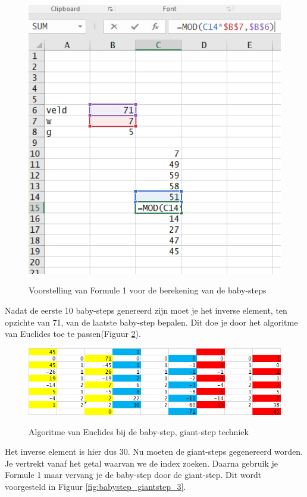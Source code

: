 \documentclass{article}
\begin{document}
\begin{figure}
  \begin{center}
  \caption{Voorstelling van Formule 1 voor de berekening van de baby-steps}
  \includegraphics[width=\textwidth]{babystep_giantstep_1}
  \label{fig:babystep_giantstep_1}
  \end{center}
  
\end{figure}
  
 
Nadat de eerste 10 baby-steps genereerd zijn moet je het inverse element, ten opzichte van 71, van de laatste baby-step bepalen. Dit doe je door het algoritme van Euclides toe te passen(Figuur \ref{fig:babystep_giantstep_2}).

\begin{figure}
  \begin{center}
  \caption{Algoritme van Euclides bij de baby-step, giant-step techniek}
  \includegraphics[width=\textwidth]{babystep_giantstep_2}
  \label{fig:babystep_giantstep_2}
  \end{center}
\end{figure}
Het inverse element is hier dus 30. Nu moeten de giant-steps gegenereerd worden. Je vertrekt vanaf het getal waarvan we de index zoeken. Daarna gebruik je Formule 1 maar vervang je de baby-step door de giant-step. Dit wordt voorgesteld in Figuur \ref{fig:babystep_giantstep_3}.
\end{document}
